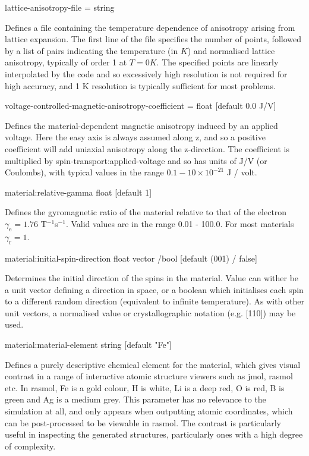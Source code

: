 {\zicf lattice-anisotropy-file = string} Defines a file containing the temperature dependence of anisotropy arising from lattice expansion. The first line of the file specifies the number of points, followed by a list of pairs indicating the temperature (in $K$) and normalised lattice anisotropy, typically of order 1 at $T = 0 K$. The specified points are
linearly interpolated by the code and so excessively high resolution is not required for high accuracy, and 1 K resolution is typically sufficient for most problems.

{\zicf voltage-controlled-magnetic-anisotropy-coefficient = float [default 0.0 J/V]}
Defines the material-dependent magnetic anisotropy induced by an applied voltage.
Here the easy axis is always assumed along z, and so a positive coefficient will
add uniaxial anisotropy along the z-direction. The coefficient is multiplied by
spin-transport:applied-voltage and so has units of J/V (or Coulombs), with typical
values in the range $0.1-10 \times 10^{-21}$ J / volt.


{\zicf material:relative-gamma float [default 1]} Defines the gyromagnetic ratio of the material relative to that of the electron $\gamma_{\mathrm{e}} = 1.76$ T$^{-1}$s$^{-1}$. Valid values are in the range 0.01 - 100.0. For most materials $\gamma_{\mathrm{r}} = 1$.

{\zicf material:initial-spin-direction float vector /bool [default (001) / false]} Determines the initial direction of the spins in the material. Value can wither be a unit vector defining a direction in space, or a boolean which initialises each spin to a different random direction (equivalent to infinite temperature). As with other unit vectors, a  normalised value or crystallographic notation (e.g. [110]) may be used.

{\zicf material:material-element string [default "Fe"]} Defines a purely descriptive chemical element for the material, which gives visual contrast in a range of interactive atomic structure viewers such as jmol, rasmol etc. In rasmol, Fe is a gold colour, H is white, Li is a deep red, O is red, B is green and Ag is a medium grey. This parameter has no relevance to the simulation at all, and only appears when outputting atomic coordinates, which can be post-processed to be viewable in rasmol. The contrast is particularly useful in inspecting the generated structures, particularly ones with a high degree of complexity.

